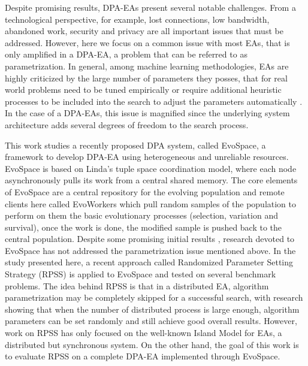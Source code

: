 \documentclass{sig-alternate}
\begin{document}
Despite promising results, DPA-EAs present several notable challenges. From a technological perspective, for example, lost 
connections, low bandwidth, abandoned work, security and privacy are all important issues that must be addressed. 
However, here we focus on a common issue with most EAs, that is only amplified in a DPA-EA, a problem that can be referred to as parametrization.
In general, among machine learning methodologies, EAs are highly criticized by the large number of parameters they posses,
that for real world problems need to be tuned empirically or require additional heuristic processes to be included into the search to
adjust the parameters automatically \cite{}.
In the case of a DPA-EAs, this issue is magnified since the underlying system architecture adds several degrees of freedom to the search process.

This work studies a recently proposed DPA system, called EvoSpace, a framework to develop DPA-EA using 
heterogeneous and unreliable resources.
EvoSpace is based on Linda's tuple
space \cite{Evospace} coordination model, where each node asynchronously
pulls its work from a central shared memory. The core elements of EvoSpace are a central 
repository for the evolving population and remote clients here called EvoWorkers
which pull random samples of the population to perform on them the basic evolutionary
processes (selection, variation and survival), once the work is done, the
modified sample is pushed back to the central population.
Despite some promising initial results \cite{}, research devoted to EvoSpace has not addressed the parametrization issue mentioned above.
In the study presented here, a recent approach called Randomized Parameter Setting Strategy (RPSS) \cite{} is applied to EvoSpace and tested on several
benchmark problems.
The idea behind RPSS is that in a distributed EA, algorithm parametrization may be completely skipped for a successful search,
with research showing that when the number of distributed process is large enough, algorithm parameters can be set randomly and still achieve
good overall results.
However, work on RPSS has only focused on the well-known Island Model for EAs, a distributed but synchronous system.
On the other hand, the goal of this work is to evaluate RPSS on a complete DPA-EA implemented through EvoSpace.
\end{document}
